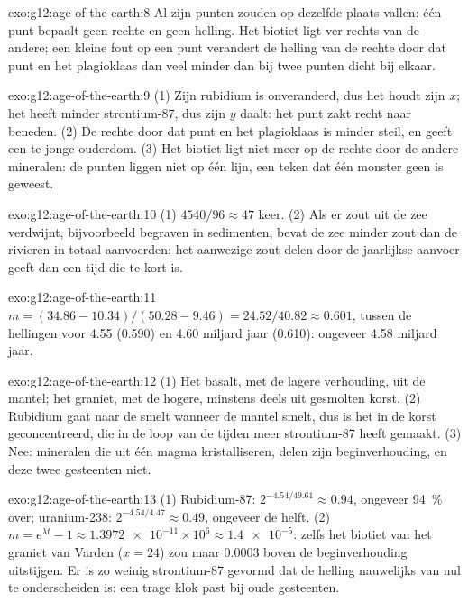\begin{solution}{exo:g12:age-of-the-earth:8}
Al zijn punten zouden op dezelfde plaats vallen: één punt bepaalt geen rechte en
geen helling. Het biotiet ligt ver rechts van de andere; een kleine fout op
een punt verandert de helling van de rechte door dat punt en het plagioklaas dan
veel minder dan bij twee punten dicht bij elkaar.
\end{solution}

\begin{solution}{exo:g12:age-of-the-earth:9}
(1) Zijn rubidium is onveranderd, dus het houdt zijn $x$; het heeft minder
strontium-87, dus zijn $y$ daalt: het punt zakt recht naar beneden. (2) De rechte
door dat punt en het plagioklaas is minder steil, en geeft een te jonge ouderdom.
(3) Het biotiet ligt niet meer op de rechte door de andere mineralen: de
punten liggen niet op één lijn, een teken dat één monster geen  is geweest.
\end{solution}

\begin{solution}{exo:g12:age-of-the-earth:10}
(1) $4540/96 \approx 47$ keer. (2) Als er zout uit de zee verdwijnt, bijvoorbeeld
begraven in sedimenten, bevat de zee minder zout dan de rivieren in totaal aanvoerden:
het aanwezige zout delen door de jaarlijkse aanvoer geeft dan een tijd die te
kort is.
\end{solution}

\begin{solution}{exo:g12:age-of-the-earth:11}
$m = (34.86 - 10.34)/(50.28 - 9.46) = 24.52/40.82 \approx 0.601$, tussen
de hellingen voor 4.55 (0.590) en 4.60 miljard jaar (0.610): ongeveer 4.58
miljard jaar.
\end{solution}

\begin{solution}{exo:g12:age-of-the-earth:12}
(1) Het basalt, met de lagere verhouding, uit de mantel; het graniet, met de
hogere, minstens deels uit gesmolten korst. (2) Rubidium gaat naar de
smelt wanneer de mantel smelt, dus is het in de korst geconcentreerd, die
in de loop van de tijden meer strontium-87 heeft gemaakt. (3) Nee: mineralen die
uit één magma kristalliseren, delen zijn beginverhouding, en deze twee gesteenten niet.
\end{solution}

\begin{solution}{exo:g12:age-of-the-earth:13}
(1) Rubidium-87: $2^{-4.54/49.61} \approx 0.94$, ongeveer \qty{94}{\percent}
over; uranium-238: $2^{-4.54/4.47} \approx 0.49$, ongeveer de helft. (2) $m =
e^{\lambda t} - 1 \approx \num{1.3972e-11} \times 10^6 \approx
\num{1.4e-5}$: zelfs het biotiet van het graniet van Varden ($x = 24$) zou
maar $0.0003$ boven de beginverhouding uitstijgen. Er is zo weinig strontium-87 gevormd
dat de helling nauwelijks van nul te onderscheiden is: een trage klok past bij oude gesteenten.
\end{solution}

